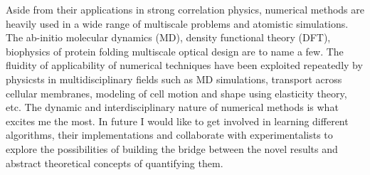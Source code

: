 \documentclass[a4paper,11pt]{article}
\begin{document}
Aside from their applications in strong correlation physics, 
numerical methods are heavily used in a wide range of multiscale problems and atomistic simulations. 
The ab-initio molecular dynamics (MD), density functional theory (DFT), biophysics of protein folding %
multiscale optical design %
are to name a few. The fluidity of applicability of numerical techniques 
have been exploited repeatedly by physicsts in multidisciplinary fields such as MD simulations,%
transport across cellular membranes, %
modeling of cell motion and shape using elasticity theory, etc. %
The dynamic and interdisciplinary nature of numerical methods is what excites me the most.
In future I would like to get involved in learning different algorithms, their implementations and collaborate with 
experimentalists to explore the possibilities of building the bridge between the novel results and 
abstract theoretical concepts of quantifying them.  
    
%

  
\end{document}
